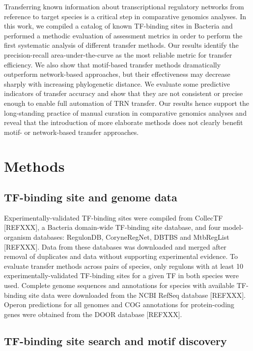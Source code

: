 Transferring known information about transcriptional regulatory networks from
reference to target species is a critical step in comparative genomics
analyses. In this work, we compiled a catalog of known TF-binding sites in
Bacteria and performed a methodic evaluation of assessment metrics in order to
perform the first systematic analysis of different transfer methods. Our
results identify the precision-recall area-under-the-curve as the most reliable
metric for transfer efficiency. We also show that motif-based transfer methods
dramatically outperform network-based approaches, but their effectiveness may
decrease sharply with increasing phylogenetic distance. We evaluate some
predictive indicators of transfer accuracy and show that they are not
consistent or precise enough to enable full automation of TRN transfer. Our
results hence support the long-standing practice of manual curation in
comparative genomics analyses and reveal that the introduction of more
elaborate methods does not clearly benefit motif- or network-based transfer
approaches.

\section{Methods}

\subsection{TF-binding site and genome data}

Experimentally-validated TF-binding sites were compiled from CollecTF [REFXXX],
a Bacteria domain-wide TF-binding site database, and four model-organism
databases: RegulonDB, CoryneRegNet, DBTBS and MtbRegList [REFXXX]. Data from
these databases was downloaded and merged after removal of duplicates and data
without supporting experimental evidence. To evaluate transfer methods across
pairs of species, only regulons with at least 10 experimentally-validated
TF-binding sites for a given TF in both species were used. Complete genome
sequences and annotations for species with available TF-binding site data were
downloaded from the NCBI RefSeq database [REFXXX]. Operon predictions for all
genomes and COG annotations for protein-coding genes were obtained from the
DOOR database [REFXXX].

\subsection{TF-binding site search and motif discovery}

